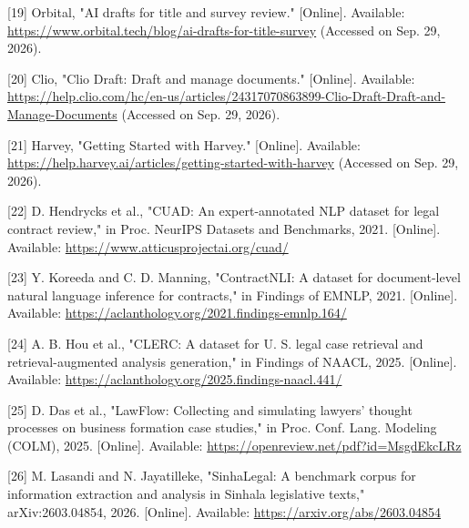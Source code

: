 \documentclass[12pt,a4paper]{article}
\begin{document}
\hangindent=0.35in  \textnormal{[19]} Orbital, "AI drafts for title and survey review." [Online]. Available: \url{https://www.orbital.tech/blog/ai-drafts-for-title-survey} (Accessed on Sep. 29, 2026).\par

\hangindent=0.35in  \textnormal{[20]} Clio, "Clio Draft: Draft and manage documents." [Online]. Available: \url{https://help.clio.com/hc/en-us/articles/24317070863899-Clio-Draft-Draft-and-Manage-Documents} (Accessed on Sep. 29, 2026).\par

\hangindent=0.35in  \textnormal{[21]} Harvey, "Getting Started with Harvey." [Online]. Available: \url{https://help.harvey.ai/articles/getting-started-with-harvey} (Accessed on Sep. 29, 2026).\par

\hangindent=0.35in  \textnormal{[22]} D. Hendrycks et al., "CUAD: An expert-annotated NLP dataset for legal contract review," in Proc. NeurIPS Datasets and Benchmarks, 2021. [Online]. Available: \url{https://www.atticusprojectai.org/cuad/}\par

\hangindent=0.35in  \textnormal{[23]} Y. Koreeda and C. D. Manning, "ContractNLI: A dataset for document-level natural language inference for contracts," in Findings of EMNLP, 2021. [Online]. Available: \url{https://aclanthology.org/2021.findings-emnlp.164/}\par

\hangindent=0.35in  \textnormal{[24]} A. B. Hou et al., "CLERC: A dataset for U. S. legal case retrieval and retrieval-augmented analysis generation," in Findings of NAACL, 2025. [Online]. Available: \url{https://aclanthology.org/2025.findings-naacl.441/}\par

\hangindent=0.35in  \textnormal{[25]} D. Das et al., "LawFlow: Collecting and simulating lawyers' thought processes on business formation case studies," in Proc. Conf. Lang. Modeling (COLM), 2025. [Online]. Available: \url{https://openreview.net/pdf?id=MsgdEkcLRz}\par

\hangindent=0.35in  \textnormal{[26]} M. Lasandi and N. Jayatilleke, "SinhaLegal: A benchmark corpus for information extraction and analysis in Sinhala legislative texts," arXiv:2603.04854, 2026. [Online]. Available: \url{https://arxiv.org/abs/2603.04854}\par
\end{document}
